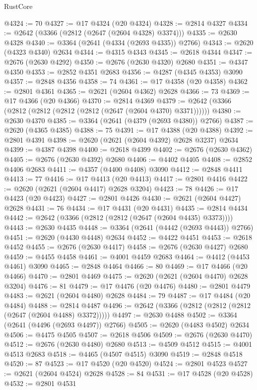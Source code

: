 \begin{lexlean}{RustCore}
\begin{coremodule}
@4324 := 70
@4327 := @17 @4324 (@20 @4324)
@4328 := @2814 @4327
@4334 := @2642 (@3366 (@2812 (@2647 (@2604 @4328) @3374)))
@4335 := @2630 @4328
@4340 := @3364 (@2641 (@4334 (@2693 @4335)) @2766)
@4343 := @2620 (@4323 @4340) @2634
@4344 := @4315 @4343
@4345 := @2618 @4344
@4347 := @2676 (@2630 @4292)
@4350 := @2676 (@2630 @4320) @2680
@4351 := @4347 @4350
@4353 := @2852 @4351 @2683
@4356 := @4287 (@4345 @4353) @3090
@4357 := @2848 @4356
@4358 := 74
@4361 := @17 @4358 (@20 @4358)
@4362 := @2801 @4361
@4365 := @2621 (@2604 @4362) @2628
@4366 := 73
@4369 := @17 @4366 (@20 @4366)
@4370 := @2814 @4369
@4379 := @2642 (@3366 (@2812 (@2812 (@2812 (@2812 (@2647 (@2604 @4370) @3371))))))
@4380 := @2630 @4370
@4385 := @3364 (@2641 (@4379 (@2693 @4380)) @2766)
@4387 := @2620 (@4365 @4385)
@4388 := 75
@4391 := @17 @4388 (@20 @4388)
@4392 := @2801 @4391
@4398 := @2620 (@2621 (@2604 @4392) @2628 @3237) @2634
@4399 := @4387 @4398
@4400 := @2618 @4399
@4402 := @2676 (@2630 @4362)
@4405 := @2676 (@2630 @4392) @2680
@4406 := @4402 @4405
@4408 := @2852 @4406 @2683
@4411 := @4357 (@4400 @4408) @3090
@4412 := @2848 @4411
@4413 := 77
@4416 := @17 @4413 (@20 @4413)
@4417 := @2801 @4416
@4422 := @2620 (@2621 (@2604 @4417) @2628 @3204)
@4423 := 78
@4426 := @17 @4423 (@20 @4423)
@4427 := @2801 @4426
@4430 := @2621 (@2604 @4427) @2628
@4431 := 76
@4434 := @17 @4431 (@20 @4431)
@4435 := @2814 @4434
@4442 := @2642 (@3366 (@2812 (@2812 (@2647 (@2604 @4435) @3373))))
@4443 := @2630 @4435
@4448 := @3364 (@2641 (@4442 (@2693 @4443)) @2766)
@4451 := @2620 (@4430 @4448) @2634
@4452 := @4422 @4451
@4453 := @2618 @4452
@4455 := @2676 (@2630 @4417)
@4458 := @2676 (@2630 @4427) @2680
@4459 := @4455 @4458
@4461 := @4001 @4459 @2683
@4464 := @4412 (@4453 @4461) @3090
@4465 := @2848 @4464
@4466 := 80
@4469 := @17 @4466 (@20 @4466)
@4470 := @2801 @4469
@4475 := @2620 (@2621 (@2604 @4470) @2628 @3204)
@4476 := 81
@4479 := @17 @4476 (@20 @4476)
@4480 := @2801 @4479
@4483 := @2621 (@2604 @4480) @2628
@4484 := 79
@4487 := @17 @4484 (@20 @4484)
@4488 := @2814 @4487
@4496 := @2642 (@3366 (@2812 (@2812 (@2812 (@2647 (@2604 @4488) @3372)))))
@4497 := @2630 @4488
@4502 := @3364 (@2641 (@4496 (@2693 @4497)) @2766)
@4505 := @2620 (@4483 @4502) @2634
@4506 := @4475 @4505
@4507 := @2618 @4506
@4509 := @2676 (@2630 @4470)
@4512 := @2676 (@2630 @4480) @2680
@4513 := @4509 @4512
@4515 := @4001 @4513 @2683
@4518 := @4465 (@4507 @4515) @3090
@4519 := @2848 @4518
@4520 := 87
@4523 := @17 @4520 (@20 @4520)
@4524 := @2801 @4523
@4527 := @2621 (@2604 @4524) @2628
@4528 := 84
@4531 := @17 @4528 (@20 @4528)
@4532 := @2801 @4531

\end{coremodule}
\end{lexlean}
